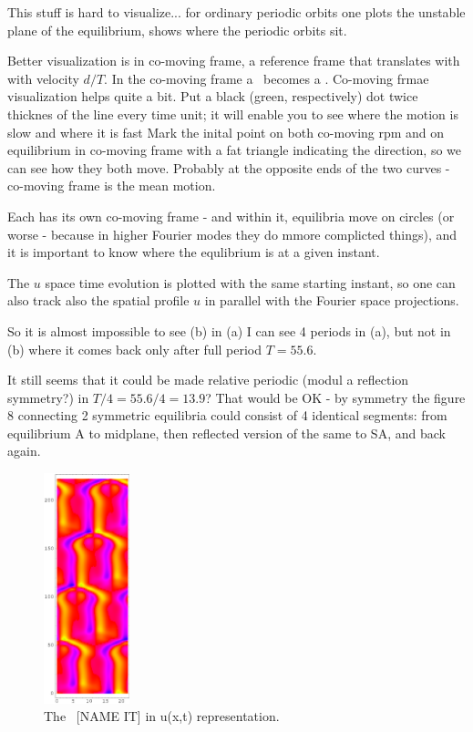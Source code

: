 This stuff is hard to visualize... for ordinary periodic orbits one
plots the unstable plane of the equilibrium, shows where the periodic
orbits sit.

Better visualization is in co-moving frame, {\ie} 
a reference frame that translates with with velocity $d/T$.
In the co-moving frame a \rpo\ becomes
a \po.
Co-moving frmae visualization helps quite a bit. Put a black (green, respectively) dot
twice thicknes of the line every time unit; it will enable you to see
where the motion is slow and where it is fast
Mark the inital point on both
co-moving rpm and on equilibrium in co-moving frame with a fat triangle
indicating the direction, so we can see how they both move. Probably at the
opposite ends of the two curves - co-moving frame is the mean motion.

Each {\rpo} has its own co-moving frame - and within it, equilibria
move on circles (or worse - because in higher Fourier modes they do mmore
complicted things), and it is important to know where the equlibrium is at
a given instant.

The $u$ space time evolution  %
is plotted with the same starting instant,
so one can also track also the spatial profile $u$ in parallel with
the Fourier space projections.

So it is almost impossible to see (b) %
in (a) %
I can see 4 periods in (a), %
but not in (b) %
where it comes back only after full period $T=55.6$.

It still seems that it could be made relative periodic (modul a reflection symmetry?)
in $T/4=55.6/4=13.9$? That would be OK - by symmetry the figure 8 connecting
2 symmetric equilibria could consist of 4 identical segments: from
equilibrium A to midplane, then reflected version of the same to SA, and
back again.


\begin{figure}[t] %
\centering
 	\includegraphics[width=2.5cm]{figs/rpo22-55-4-u.eps}
\hspace{0.1in}
\caption{
 The \rpo\ [NAME IT] in u(x,t) representation. 
        }
\label{f:rpoNAMEITu}
\end{figure}



